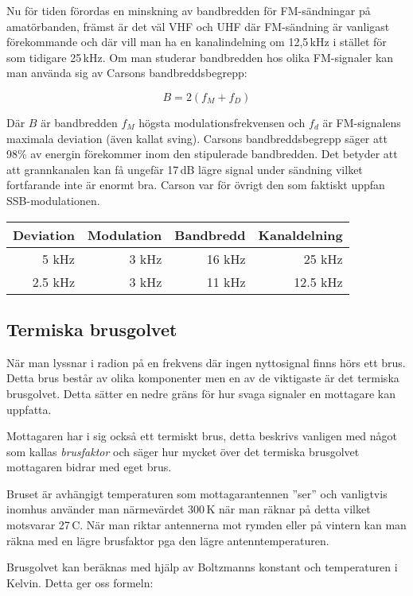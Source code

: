 Nu för tiden förordas en minskning av bandbredden för FM-sändningar på
amatörbanden, främst är det väl VHF och UHF där FM-sändning är vanligast
förekommande och där vill man ha en kanalindelning om 12,5\,kHz i stället för
som tidigare 25\,kHz. Om man studerar bandbredden hos olika FM-signaler kan
man använda sig av Carsons bandbreddsbegrepp:

$$B=2(f_M+f_D)$$

Där $B$ är bandbredden $f_M$ högsta modulationsfrekvensen och $f_d$ är
FM-signalens maximala deviation (även kallat sving). Carsons bandbreddsbegrepp
säger att 98\% av energin förekommer inom den stipulerade bandbredden. Det
betyder att att grannkanalen kan få ungefär 17\,dB lägre signal under sändning
vilket fortfarande inte är enormt bra. Carson var för övrigt den som faktiskt
uppfan SSB-modulationen.

\begin{center}
\begin{tabular}{rrrr}
Deviation & Modulation & Bandbredd & Kanaldelning\\ \hline
5 kHz & 3 kHz & 16 kHz & 25 kHz\\
2.5 kHz & 3 kHz & 11 kHz & 12.5 kHz\\
\end{tabular}
\end{center}

\subsection{Termiska brusgolvet}
När man lyssnar i radion på en frekvens där ingen nyttosignal finns hörs ett
brus. Detta brus består av olika komponenter men en av de viktigaste är det
termiska brusgolvet. Detta sätter en nedre gräns för hur svaga signaler en
mottagare kan uppfatta.

Mottagaren har i sig också ett termiskt brus, detta beskrivs vanligen med
något som kallas \textit{brusfaktor} och säger hur mycket över det termiska
brusgolvet mottagaren bidrar med eget brus.

Bruset är avhängigt temperaturen som mottagarantennen ''ser'' och vanligtvis
inomhus använder man närmevärdet 300\,K när man räknar på detta vilket
motsvarar 27\,\textdegree C. När man riktar antennerna mot rymden eller på
vintern kan man räkna med en lägre brusfaktor pga den lägre
antenntemperaturen.

Brusgolvet kan beräknas med hjälp av Boltzmanns konstant och temperaturen i
Kelvin. Detta ger oss formeln:

